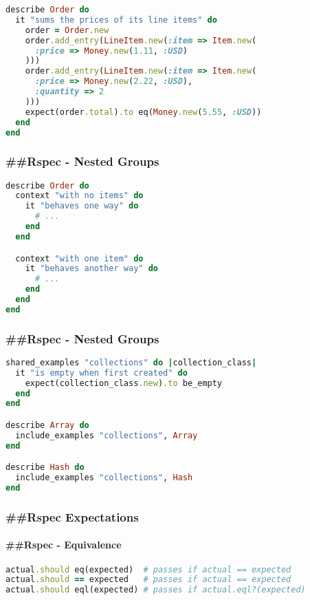 \documentclass[serif,mathserif]{article}
\begin{document}
\begin{lstlisting}[language=ruby]
describe Order do
  it "sums the prices of its line items" do
    order = Order.new
    order.add_entry(LineItem.new(:item => Item.new(
      :price => Money.new(1.11, :USD)
    )))
    order.add_entry(LineItem.new(:item => Item.new(
      :price => Money.new(2.22, :USD),
      :quantity => 2
    )))
    expect(order.total).to eq(Money.new(5.55, :USD))
  end
end
\end{lstlisting}

\subsubsection{\#\#Rspec - Nested Groups}
\begin{lstlisting}[language=ruby]
 describe Order do
  context "with no items" do
    it "behaves one way" do
      # ...
    end
  end

  context "with one item" do
    it "behaves another way" do
      # ...
    end
  end
end
\end{lstlisting}

 
 \subsubsection{\#\#Rspec - Nested Groups}
\begin{lstlisting}[language=ruby]
shared_examples "collections" do |collection_class|
  it "is empty when first created" do
    expect(collection_class.new).to be_empty
  end
end

describe Array do
  include_examples "collections", Array
end

describe Hash do
  include_examples "collections", Hash
end
\end{lstlisting}

\subsubsection{\#\#Rspec Expectations}

\paragraph{\#\#Rspec - Equivalence}
\begin{lstlisting}[language=ruby]
actual.should eq(expected)  # passes if actual == expected
actual.should == expected   # passes if actual == expected
actual.should eql(expected) # passes if actual.eql?(expected)
\end{lstlisting}
\end{document}
